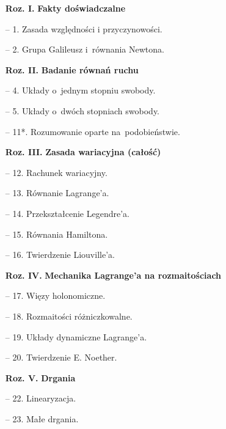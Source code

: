 \documentclass[a4paper,11pt]{article}
\begin{document}
\begin{itemize}
\item[\textbf{Roz. I.}] \textbf{Fakty doświadczalne}

\item[--] 1. Zasada względności i przyczynowości.

\item[--] 2. Grupa Galileusz i~równania Newtona.


\item[\textbf{Roz. II.}] \textbf{Badanie równań ruchu}

\item[--] 4. Układy o~jednym stopniu swobody.

\item[--] 5. Układy o~dwóch stopniach swobody.

\item[--] 11*. Rozumowanie oparte na~podobieństwie.


\item[\textbf{Roz. III.}] \textbf{Zasada wariacyjna (całość)}

\item[--] 12. Rachunek wariacyjny.

\item[--] 13. Równanie Lagrange’a.

\item[--] 14. Przekształcenie Legendre’a.

\item[--] 15. Równania Hamiltona.

\item[--] 16. Twierdzenie Liouville’a.


\item[\textbf{Roz. IV.}] \textbf{Mechanika Lagrange’a na
    rozmaitościach}

\item[--] 17. Więzy holonomiczne.

\item[--] 18. Rozmaitości różniczkowalne.

\item[--] 19. Układy dynamiczne Lagrange'a.

\item[--] 20. Twierdzenie E. Noether.


\item[\textbf{Roz. V.}] \textbf{Drgania}

\item[--] 22. Linearyzacja.

\item[--] 23. Małe drgania.


\end{itemize}
\end{document}

